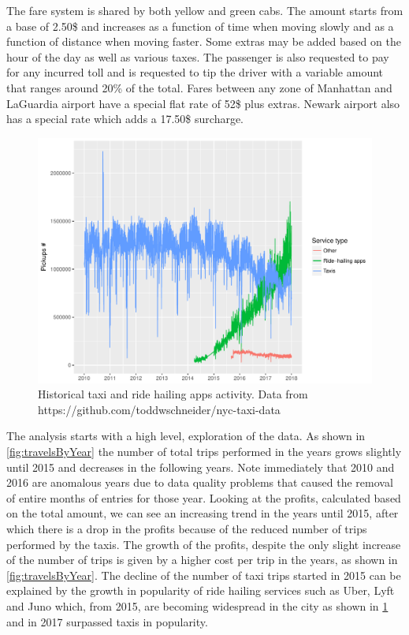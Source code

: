 \documentclass{acm_proc_article-sp-sigmod09}
\begin{document}
The fare system is shared by both yellow and green cabs. The amount starts from a base of 2.50\$ and increases as a function of time when moving slowly and as a function of distance when moving faster. Some extras may be added based on the hour of the day as well as various taxes. The passenger is also requested to pay for any incurred toll and is requested to tip the driver with a variable amount that ranges around 20\% of the total. Fares between any zone of Manhattan and LaGuardia airport have a special flat rate of 52\$ plus extras. Newark airport also has a special rate which adds a 17.50\$ surcharge.

\begin{figure}
	\centering
	\includegraphics[width=1\columnwidth]{resources/fhv_vs_taxi.pdf}
	\caption{Historical taxi and ride hailing apps activity. Data from https://github.com/toddwschneider/nyc-taxi-data}
	\label{fig:uberVsTaxis}
\end{figure}

The analysis starts with a high level, exploration of the data. As shown in \cref{fig:travelsByYear} the number of total trips performed in the years grows slightly until 2015 and decreases in the following years. Note immediately that 2010 and 2016 are anomalous years due to data quality problems that caused the removal of entire months of entries for those year. Looking at the profits, calculated based on the total amount, we can see an increasing trend in the years until 2015, after which there is a drop in the profits because of the reduced number of trips performed by the taxis. The growth of the profits, despite the only slight increase of the number of trips is given by a higher cost per trip in the years, as shown in \cref{fig:travelsByYear}. The decline of the number of taxi trips started in 2015 can be explained by the growth in popularity of ride hailing services such as Uber, Lyft and Juno which, from 2015, are becoming widespread in the city as shown in \cref{fig:uberVsTaxis} and in 2017 surpassed taxis in popularity.
\end{document}
